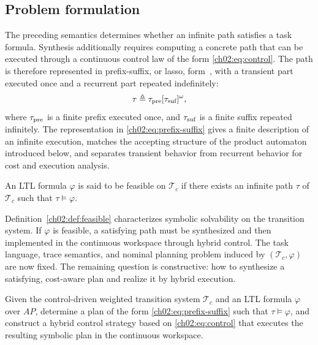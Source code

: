 \subsection{Problem formulation}
\label{ch02:sec:single-problem}

The preceding semantics determines whether an infinite path satisfies a task
formula. Synthesis additionally requires computing a concrete path that can be
executed through a continuous control law of the form \eqref{ch02:eq:control}.
The path is therefore represented in prefix-suffix, or lasso,
form~\citep{schuppan2005shortest}, with a transient part executed once and a
recurrent part repeated indefinitely:
\begin{equation}
\tau \triangleq \tau_{\textup{pre}}
[\tau_{\textup{suf}}]^{\omega},
\label{ch02:eq:prefix-suffix}
\end{equation}
where $\tau_{\textup{pre}}$ is a finite prefix executed once, and
$\tau_{\textup{suf}}$ is a finite suffix repeated infinitely.
The representation in \eqref{ch02:eq:prefix-suffix} gives a finite description
of an infinite execution, matches the accepting structure of the product
automaton introduced below, and separates transient behavior from recurrent
behavior for cost and execution analysis.

\begin{definition}
\label{ch02:def:feasible}
An LTL formula $\varphi$ is said to be feasible on $\mathcal{T}_c$ if there
exists an infinite path $\tau$ of $\mathcal{T}_c$ such that
$\tau \models \varphi$.
\end{definition}

Definition~\ref{ch02:def:feasible} characterizes symbolic solvability on the
transition system. If $\varphi$ is feasible, a satisfying path must be
synthesized and then implemented in the continuous workspace through hybrid
control.
The task language, trace semantics, and nominal planning problem induced by
$(\mathcal{T}_c,\varphi)$ are now fixed. The remaining question is constructive:
how to synthesize a satisfying, cost-aware plan and realize it by hybrid
execution.

\begin{problem}
\label{ch02:prob:nominal}
Given the control-driven weighted transition system $\mathcal{T}_c$ and an LTL
formula $\varphi$ over $AP$, determine a plan of the form
\eqref{ch02:eq:prefix-suffix} such that $\tau \models \varphi$, and construct a
hybrid control strategy based on \eqref{ch02:eq:control} that executes the
resulting symbolic plan in the continuous workspace.
\end{problem}


